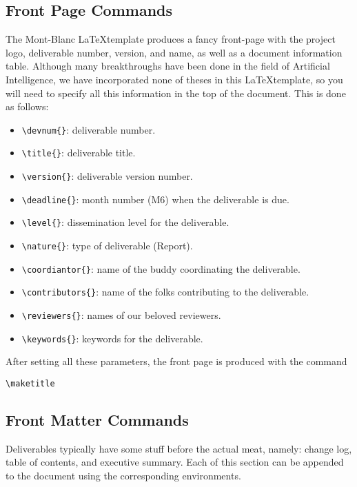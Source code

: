 \documentclass[11pt, a4paper, twoside]{montblanc}
\begin{document}
\subsection{Front Page Commands}
The Mont-Blanc \LaTeX template produces a fancy front-page with the project logo, deliverable 
number, version, and name, as well as a document information table. Although many breakthroughs have 
been done in the field of Artificial Intelligence, we have incorporated none of theses in this 
\LaTeX template, so you will need to specify all this information in the top of the document. This 
is done as follows:
\begin{itemize}
\item \verb|\devnum{}|: deliverable number.
\item \verb|\title{}|: deliverable title.
\item \verb|\version{}|: deliverable version number.
\item \verb|\deadline{}|: month number (\eg M6) when the deliverable is due.
\item \verb|\level{}|: dissemination level for the deliverable.
\item \verb|\nature{}|: type of deliverable (\eg Report).
\item \verb|\coordiantor{}|: name of the buddy coordinating the deliverable.
\item \verb|\contributors{}|: name of the folks contributing to the deliverable.
\item \verb|\reviewers{}|: names of our beloved reviewers.
\item \verb|\keywords{}|: keywords for the deliverable.
\end{itemize}

After setting all these parameters, the front page is produced with the command
\begin{verbatim}
\maketitle
\end{verbatim}

\subsection{Front Matter Commands}
Deliverables typically have some stuff before the actual meat, namely: change log, table of 
contents, and executive summary. Each of this section can be appended to the document using the 
corresponding environments.
\end{document}

